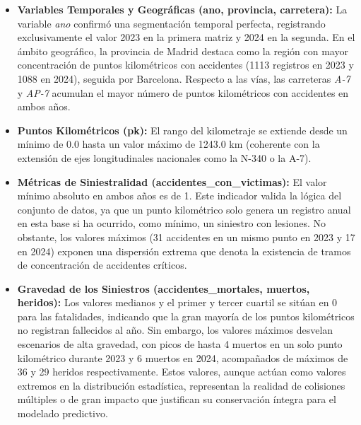 \documentclass[twoside,a4paper,12pt,onecolumn,openany]{book}
\begin{document}
\begin{itemize}
    \item \textbf{Variables Temporales y Geográficas (ano, provincia, carretera):} La variable \textit{ano} confirmó una segmentación temporal perfecta, registrando exclusivamente el valor 2023 en la primera matriz y 2024 en la segunda. En el ámbito geográfico, la provincia de Madrid destaca como la región con mayor concentración de puntos kilométricos con accidentes (1113 registros en 2023 y 1088 en 2024), seguida por Barcelona. Respecto a las vías, las carreteras \textit{A-7} y \textit{AP-7} acumulan el mayor número de puntos kilométricos con accidentes en ambos años.
    
    \item \textbf{Puntos Kilométricos (pk):} El rango del kilometraje se extiende desde un mínimo de 0.0 hasta un valor máximo de 1243.0 km (coherente con la extensión de ejes longitudinales nacionales como la N-340 o la A-7). 
    
    \item \textbf{Métricas de Siniestralidad (accidentes\_con\_victimas):} El valor mínimo absoluto en ambos años es de 1. Este indicador valida la lógica del conjunto de datos, ya que un punto kilométrico solo genera un registro anual en esta base si ha ocurrido, como mínimo, un siniestro con lesiones. No obstante, los valores máximos (31 accidentes en un mismo punto en 2023 y 17 en 2024) exponen una dispersión extrema que denota la existencia de tramos de concentración de accidentes críticos.
    
    \item \textbf{Gravedad de los Siniestros (accidentes\_mortales, muertos, heridos):} Los valores medianos y el primer y tercer cuartil se sitúan en 0 para las fatalidades, indicando que la gran mayoría de los puntos kilométricos no registran fallecidos al año. Sin embargo, los valores máximos desvelan escenarios de alta gravedad, con picos de hasta 4 muertos en un solo punto kilométrico durante 2023 y 6 muertos en 2024, acompañados de máximos de 36 y 29 heridos respectivamente. Estos valores, aunque actúan como valores extremos en la distribución estadística, representan la realidad de colisiones múltiples o de gran impacto que justifican su conservación íntegra para el modelado predictivo.
\end{itemize}

\clearpage
\end{document}
